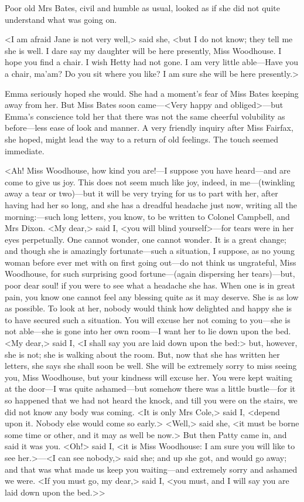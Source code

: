 Poor old Mrs Bates, civil and humble as usual, looked as if she did not quite understand what was going on.

<I am afraid Jane is not very well,> said she, <but I do not know; they tell me she is well. I dare say my daughter will be here presently, Miss Woodhouse. I hope you find a chair. I wish Hetty had not gone. I am very little able—Have you a chair, ma'am? Do you sit where you like? I am sure she will be here presently.>

Emma seriously hoped she would. She had a moment's fear of Miss Bates keeping away from her. But Miss Bates soon came—<Very happy and obliged>—but Emma's conscience told her that there was not the same cheerful volubility as before—less ease of look and manner. A very friendly inquiry after Miss Fairfax, she hoped, might lead the way to a return of old feelings. The touch seemed immediate.

<Ah! Miss Woodhouse, how kind you are!—I suppose you have heard—and are come to give us joy. This does not seem much like joy, indeed, in me—(twinkling away a tear or two)—but it will be very trying for us to part with her, after having had her so long, and she has a dreadful headache just now, writing all the morning:—such long letters, you know, to be written to Colonel Campbell, and Mrs Dixon. <My dear,> said I, <you will blind yourself>—for tears were in her eyes perpetually. One cannot wonder, one cannot wonder. It is a great change; and though she is amazingly fortunate—such a situation, I suppose, as no young woman before ever met with on first going out—do not think us ungrateful, Miss Woodhouse, for such surprising good fortune—(again dispersing her tears)—but, poor dear soul! if you were to see what a headache she has. When one is in great pain, you know one cannot feel any blessing quite as it may deserve. She is as low as possible. To look at her, nobody would think how delighted and happy she is to have secured such a situation. You will excuse her not coming to you—she is not able—she is gone into her own room—I want her to lie down upon the bed. <My dear,> said I, <I shall say you are laid down upon the bed:> but, however, she is not; she is walking about the room. But, now that she has written her letters, she says she shall soon be well. She will be extremely sorry to miss seeing you, Miss Woodhouse, but your kindness will excuse her. You were kept waiting at the door—I was quite ashamed—but somehow there was a little bustle—for it so happened that we had not heard the knock, and till you were on the stairs, we did not know any body was coming. <It is only Mrs Cole,> said I, <depend upon it. Nobody else would come so early.> <Well,> said she, <it must be borne some time or other, and it may as well be now.> But then Patty came in, and said it was you. <Oh!> said I, <it is Miss Woodhouse: I am sure you will like to see her.>—<I can see nobody,> said she; and up she got, and would go away; and that was what made us keep you waiting—and extremely sorry and ashamed we were. <If you must go, my dear,> said I, <you must, and I will say you are laid down upon the bed.>>

